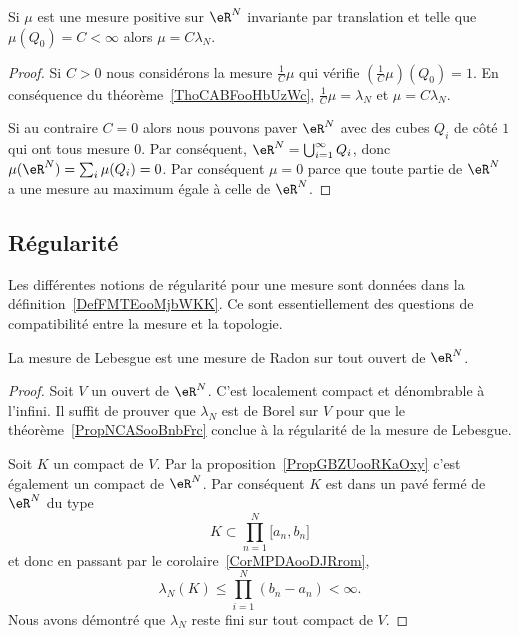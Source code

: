 \begin{corollary}       \label{CorKGMRooHWOQGP}
	Si \( \mu\) est une mesure positive sur \( \eR^N\) invariante par translation et telle que \( \mu(Q_0)=C<\infty\) alors \( \mu=C\lambda_N\).
\end{corollary}

\begin{proof}
	Si \( C>0\) nous considérons la mesure \( \frac{1}{ C }\mu\) qui vérifie \( (\frac{1}{ C }\mu)(Q_0)=1\). En conséquence du théorème~\ref{ThoCABFooHbUzWc}, \( \frac{1}{ C }\mu=\lambda_N\) et \( \mu=C\lambda_N\).

	Si au contraire \( C=0\) alors nous pouvons paver \( \eR^N\) avec des cubes \( Q_i\) de côté \( 1\) qui ont tous mesure \( 0\). Par conséquent, \( \eR^N=\bigcup_{i=1}^{\infty}Q_i\), donc \( \mu(\eR^N)=\sum_i\mu(Q_i)=0\). Par conséquent \( \mu=0\) parce que toute partie de \( \eR^N\) a une mesure au maximum égale à celle de \( \eR^N\).
\end{proof}

\subsection{Régularité}

Les différentes notions de régularité pour une mesure sont données dans la définition~\ref{DefFMTEooMjbWKK}. Ce sont essentiellement des questions de compatibilité entre la mesure et la topologie.
\begin{proposition}
	La mesure de Lebesgue est une mesure de Radon sur tout ouvert de \( \eR^N\).
\end{proposition}

\begin{proof}
	Soit \( V\) un ouvert de \( \eR^N\). C'est localement compact et dénombrable à l'infini. Il suffit de prouver que \( \lambda_N\) est de Borel sur \( V\) pour que le théorème~\ref{PropNCASooBnbFrc} conclue à la régularité de la mesure de Lebesgue.

	Soit \( K\) un compact de \( V\). Par la proposition~\ref{PropGBZUooRKaOxy} c'est également un compact de \( \eR^N\). Par conséquent \( K\) est dans un pavé fermé de \( \eR^N\) du type
	\begin{equation}
		K\subset \prod_{n=1}^N\mathopen[ a_n , b_n \mathclose]
	\end{equation}
	et donc en passant par le corolaire~\ref{CorMPDAooDJRrom},
	\begin{equation}
		\lambda_N(K)\leq \prod_{i=1}^N(b_n-a_n)<\infty.
	\end{equation}
	Nous avons démontré que \( \lambda_N\) reste fini sur tout compact de \( V\).
\end{proof}
